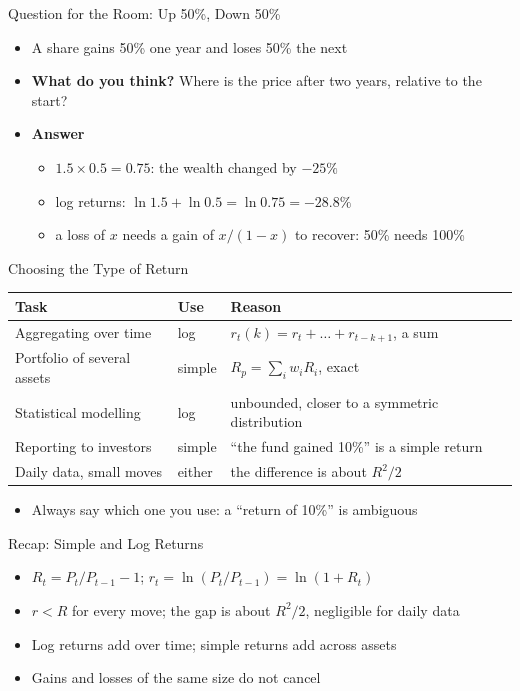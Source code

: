\begin{frame}{Question for the Room: Up 50\%, Down 50\%}
\itemsize{\small}
\begin{itemize}
    \item A share gains 50\% one year and loses 50\% the next
    \item \textbf{What do you think?} Where is the price after two years, relative to the start?
    \item \textbf{Answer}
    \begin{itemize}
        \item $1.5 \times 0.5 = 0.75$: the wealth changed by $-25\%$
        \item log returns: $\ln 1.5 + \ln 0.5 = \ln 0.75 = -28.8\%$
        \item a loss of $x$ needs a gain of $x/(1-x)$ to recover: 50\% needs 100\%
    \end{itemize}
\end{itemize}
\end{frame}

\begin{frame}{Choosing the Type of Return}
\itemsize{\small}
\begin{center}
\footnotesize
\begin{tabular}{>{\raggedright\arraybackslash}p{4.2cm}>{\raggedright\arraybackslash}p{2.6cm}>{\raggedright\arraybackslash}p{5.6cm}}
\toprule
\textbf{Task} & \textbf{Use} & \textbf{Reason} \\
\midrule
Aggregating over time & log & $r_{t}(k) = r_t + \dots + r_{t-k+1}$, a sum \\
Portfolio of several assets & simple & $R_p = \sum_i w_i R_i$, exact \\
Statistical modelling & log & unbounded, closer to a symmetric distribution \\
Reporting to investors & simple & ``the fund gained 10\%'' is a simple return \\
Daily data, small moves & either & the difference is about $R^2/2$ \\
\bottomrule
\end{tabular}
\end{center}
\begin{itemize}
    \item Always say which one you use: a ``return of 10\%'' is ambiguous
\end{itemize}
\end{frame}

\begin{frame}{Recap: Simple and Log Returns}
\itemsize{\small}
\begin{itemize}
    \item $R_t = P_t/P_{t-1} - 1$; $r_t = \ln(P_t/P_{t-1}) = \ln(1 + R_t)$
    \item $r < R$ for every move; the gap is about $R^2/2$, negligible for daily data
    \item Log returns add over time; simple returns add across assets
    \item Gains and losses of the same size do not cancel
\end{itemize}
\end{frame}


